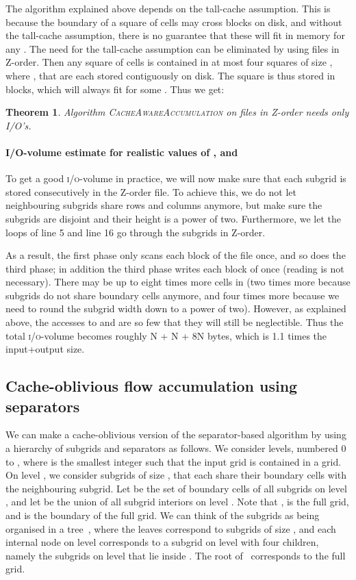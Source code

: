 \documentclass[10pt,a4paper]{article}
\newtheorem{theorem}{Theorem}
\def\io{\textsc{i/o}\xspace}
\begin{document}
The algorithm explained above depends on the tall-cache assumption. This is because the boundary of a square of  cells may cross  blocks on disk, and without the tall-cache assumption, there is no guarantee that these will fit in memory for any . The need for the tall-cache assumption can be eliminated by using files in Z-order. Then any square  of  cells is contained in at most four squares of size , where , that are each stored contiguously on disk. The square  is thus stored in  blocks, which will always fit for some . Thus we get:

\begin{theorem}\label{CacheAwareAccumulation}
Algorithm \textsc{CacheAwareAccumulation} on files in Z-order needs only  I/O's.
\end{theorem}

\paragraph*{I/O-volume estimate for realistic values of ,  and }
To get a good \io-volume in practice, we will now make sure that each subgrid  is stored consecutively in the Z-order file. To achieve this, we do not let neighbouring subgrids share rows and columns anymore, but make sure the subgrids are disjoint and their height is a power of two. Furthermore, we let the loops of line 5 and line 16 go through the subgrids in Z-order.

As a result, the first phase only scans each block of the  file once, and so does the third phase; in addition the third phase writes each block of  once (reading is not necessary). There may be up to eight times more cells in  (two times more because subgrids do not share boundary cells anymore, and four times more because we need to round the subgrid width down to a power of two). However, as explained above, the accesses to  and  are so few that they will still be neglectible. Thus the total \io-volume becomes roughly N + N + 8N bytes, which is 1.1 times the input+output size.

\subsection{Cache-oblivious flow accumulation using separators}\label{sec:cacheobliviousaccumulation}

We can make a cache-oblivious version of the separator-based algorithm by using a hierarchy of subgrids and separators as follows. We consider  levels, numbered 0 to , where  is the smallest integer such that the input grid is contained in a  grid. On level , we consider subgrids of size , that each share their boundary cells with the neighbouring subgrid. Let  be the set of boundary cells of all subgrids on level , and let  be the union of all subgrid interiors on level . Note that ,  is the full grid, and  is the boundary of the full grid. We can think of the subgrids as being organised in a tree~, where the leaves correspond to subgrids of size , and each internal node on level  corresponds to a subgrid  on level  with four children, namely the subgrids on level  that lie inside . The root of~ corresponds to the full grid.
\end{document}
